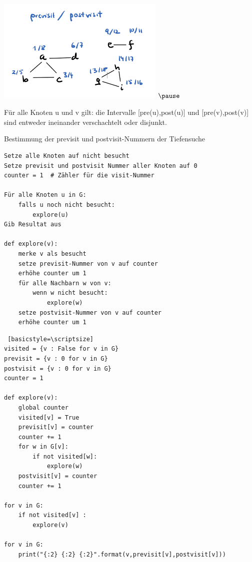 \begin{frame}[fragile]

\includegraphics[width=8cm]{bild8.png}   $\pause$         

Für alle Knoten u und v gilt: die Intervalle [pre(u),post(u)] und [pre(v),post(v)] sind entweder
ineinander verschachtelt oder disjunkt.
\end{frame}

\begin{frame}[fragile]
Bestimmung der previsit und postvisit-Nummern der Tiefensuche
\begin{lstlisting} 
Setze alle Knoten auf nicht besucht
Setze previsit und postvisit Nummer aller Knoten auf 0
counter = 1  # Zähler für die visit-Nummer

Für alle Knoten u in G:
    falls u noch nicht besucht:
        explore(u)
Gib Resultat aus

def explore(v):
    merke v als besucht
    setze previsit-Nummer von v auf counter
    erhöhe counter um 1
    für alle Nachbarn w von v:
        wenn w nicht besucht:
            explore(w)
    setze postvisit-Nummer von v auf counter
    erhöhe counter um 1

\end{lstlisting} 
\end{frame}

\begin{frame}[fragile] 
\begin{lstlisting} [basicstyle=\scriptsize]
visited = {v : False for v in G}  
previsit = {v : 0 for v in G}         
postvisit = {v : 0 for v in G}     
counter = 1

def explore(v):
    global counter
    visited[v] = True
    previsit[v] = counter
    counter += 1
    for w in G[v]:
        if not visited[w]:
            explore(w)
    postvisit[v] = counter
    counter += 1

for v in G:
    if not visited[v] :
        explore(v)

for v in G:
    print("{:2} {:2} {:2}".format(v,previsit[v],postvisit[v]))
\end{lstlisting} 
\end{frame}

